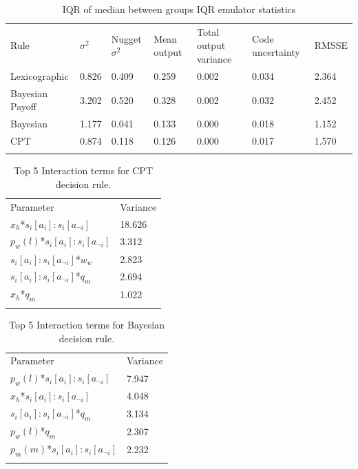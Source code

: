 \documentclass[graybox]{svmult}
\begin{document}
\begin{table}[H]
\caption{IQR of median between groups IQR emulator statistics \label{tab:sa_emulator_iqr_iqr}}
\begin{tabular} {lllllll}
\hline\noalign{\smallskip}
Rule & \(\sigma^2\) & Nugget \(\sigma^2\) & Mean output & Total output variance & Code uncertainty & RMSSE \\
\noalign{\smallskip}\svhline\noalign{\smallskip}
Lexicographic & 0.826 & 0.409 & 0.259 & 0.002 & 0.034 & 2.364 \\
Bayesian Payoff & 3.202 & 0.520 & 0.328 & 0.002 & 0.032 & 2.452 \\
Bayesian & 1.177 & 0.041 & 0.133 & 0.000 & 0.018 & 1.152 \\
\ac{CPT} & 0.874 & 0.118 & 0.126 & 0.000 & 0.017 & 1.570 \\
\noalign{\smallskip}\hline\noalign{\smallskip}
\end{tabular}
\end{table}

\begin{table}[H]
\caption{Top 5 Interaction terms for \ac{CPT} decision rule. \label{tab:sa_interaction_prospect_group_iqr_iqr}}
\begin{tabular} {ll}
\hline\noalign{\smallskip}
Parameter & Variance \\ 
\noalign{\smallskip}\svhline\noalign{\smallskip}

\(x_{h}\)*\(s_{i}[a_{i}]:s_{i}[a_{\neg i}]\) & 18.626\\
\(p_{w}(l)\)*\(s_{i}[a_{i}]:s_{i}[a_{\neg i}]\) & 3.312\\
\(s_{i}[a_{i}]:s_{i}[a_{\neg i}]\)*\(w_{w}\) & 2.823\\
\(s_{i}[a_{i}]:s_{i}[a_{\neg i}]\)*\(q_{m}\) & 2.694\\
\(x_{h}\)*\(q_{m}\) & 1.022\\
\noalign{\smallskip}\hline\noalign{\smallskip}
\end{tabular}
\end{table}

\begin{table}[H]
\caption{Top 5 Interaction terms for Bayesian decision rule. \label{tab:sa_interaction_sharing_group_iqr_iqr}}
\begin{tabular} {ll}
\hline\noalign{\smallskip}
Parameter & Variance \\
\noalign{\smallskip}\svhline\noalign{\smallskip}
\(p_{w}(l)\)*\(s_{i}[a_{i}]:s_{i}[a_{\neg i}]\) & 7.947\\
\(x_{h}\)*\(s_{i}[a_{i}]:s_{i}[a_{\neg i}]\) & 4.048\\
\(s_{i}[a_{i}]:s_{i}[a_{\neg i}]\)*\(q_{m}\) & 3.134\\
\(p_{w}(l)\)*\(q_{m}\) & 2.307\\
\(p_{m}(m)\)*\(s_{i}[a_{i}]:s_{i}[a_{\neg i}]\) & 2.232\\
\noalign{\smallskip}\hline\noalign{\smallskip}
\end{tabular}
\end{table}
\end{document}
